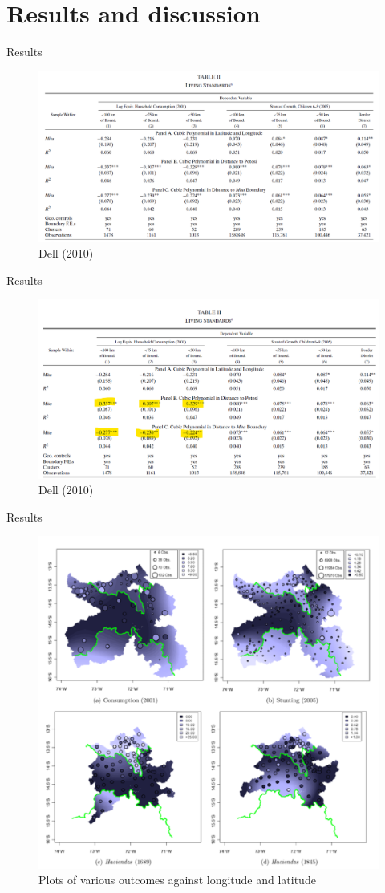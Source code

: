 \documentclass[notes,11pt, aspectratio=169]{beamer}
\begin{document}
\section{Results and discussion}

\begin{frame}{Results}
    \begin{figure}
        \centering
        \includegraphics[width=0.8\linewidth]{Table2.png}
        \caption{Dell (2010)}
        \label{fig:enter-label}
    \end{figure}
\end{frame}

\begin{frame}{Results}
    \begin{figure}
        \centering
        \includegraphics[width=0.8\linewidth]{Table2b.png}
        \caption{Dell (2010)}
        \label{fig:enter-label}
    \end{figure}
\end{frame}

\begin{frame}{Results}
    \begin{figure}
        \centering
        \includegraphics[width=0.45\linewidth]{Picture5.png}
        \caption{Plots of various outcomes against longitude and latitude}
        \label{fig:enter-label}
    \end{figure}
\end{frame}
\end{document}
